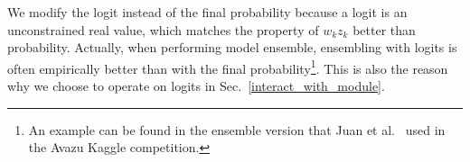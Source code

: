 We modify the logit instead of the final probability because a logit is an unconstrained real value, which matches the property of $w_k
z_k$ better than probability. Actually, when performing model ensemble,
ensembling with logits is often empirically better than with the final probability\footnote{ An example can be found in the ensemble
version that Juan et al.~ used in the Avazu Kaggle competition. }. This is also the reason why we choose to
operate on logits in Sec.~\ref{interact_with_module}.
